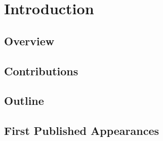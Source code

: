\chapter{Introduction}

\section{Overview}
\section{Contributions}
\section{Outline}
\section{First Published Appearances}
